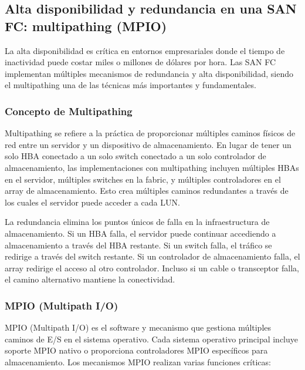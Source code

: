 \subsection{Alta disponibilidad y redundancia en una SAN FC: multipathing (MPIO)}

La alta disponibilidad es crítica en entornos empresariales donde el tiempo de inactividad puede costar miles o millones de dólares por hora. Las SAN FC implementan múltiples mecanismos de redundancia y alta disponibilidad, siendo el multipathing una de las técnicas más importantes y fundamentales.

\subsubsection{Concepto de Multipathing}

Multipathing se refiere a la práctica de proporcionar múltiples caminos físicos de red entre un servidor y un dispositivo de almacenamiento. En lugar de tener un solo HBA conectado a un solo switch conectado a un solo controlador de almacenamiento, las implementaciones con multipathing incluyen múltiples HBAs en el servidor, múltiples switches en la fabric, y múltiples controladores en el array de almacenamiento. Esto crea múltiples caminos redundantes a través de los cuales el servidor puede acceder a cada LUN.

La redundancia elimina los puntos únicos de falla en la infraestructura de almacenamiento. Si un HBA falla, el servidor puede continuar accediendo a almacenamiento a través del HBA restante. Si un switch falla, el tráfico se redirige a través del switch restante. Si un controlador de almacenamiento falla, el array redirige el acceso al otro controlador. Incluso si un cable o transceptor falla, el camino alternativo mantiene la conectividad.

\subsubsection{MPIO (Multipath I/O)}

MPIO (Multipath I/O) es el software y mecanismo que gestiona múltiples caminos de E/S en el sistema operativo. Cada sistema operativo principal incluye soporte MPIO nativo o proporciona controladores MPIO específicos para almacenamiento. Los mecanismos MPIO realizan varias funciones críticas:

